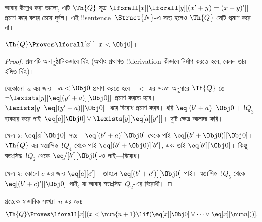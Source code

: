 \documentclass[../../../include/open-logic-section]{subfiles}
\begin{document}
আবার উল্লেখ করা ভালো, এটি $\Th{Q}$ সূত্র
$\lforall[x][\lforall[y][(x' + y) = (x + y)']]$ প্রমাণ করে বলার চেয়ে দুর্বল।
এই !!{sentence}~$\Struct{N}$-এ সত্য হলেও $\Th{Q}$ সেটি প্রমাণ করে না।

\begin{lem}
$\Th{Q} \Proves \lforall[x][\lnot x < \Obj 0]$।
\end{lem}

\begin{proof}
প্রমাণটি অনানুষ্ঠানিকভাবে দিই (অর্থাৎ প্রথাগত !!{derivation} কীভাবে নির্মাণ
করতে হবে, কেবল তার ইঙ্গিত দিই)।

যেকোনো~$a$-এর জন্য $\lnot a < \Obj 0$ প্রমাণ করতে হবে। $<$-এর সংজ্ঞা
অনুসারে $\Th{Q}$-তে
$\lnot \lexists[y][\eq[(y'+a)][\Obj 0]]$ প্রমাণ করতে হবে।
$\lexists[y][\eq[(y'+a)][\Obj 0]]$ ধরে বিরোধ প্রমাণ করব। ধরি
$\eq[(b'+a)][\Obj 0]$। $!Q_3$ ব্যবহার করে পাই
$\eq[a][\Obj 0] \lor \lexists[y][\eq[a][y']]$। দুটি ক্ষেত্র আলাদা করি।

ক্ষেত্র ১: $\eq[a][\Obj 0]$ সত্য। $\eq[(b'+a)][\Obj 0]$ থেকে পাই
$\eq[(b' + \Obj 0)][\Obj 0]$। $\Th{Q}$-এর স্বতঃসিদ্ধ~$!Q_4$ থেকে পাই
$\eq[(b' + \Obj 0)][b']$, এবং তাই $\eq[b'][\Obj 0]$। কিন্তু
স্বতঃসিদ্ধ~$!Q_2$ থেকে $\eq/[b'][\Obj 0]$-ও পাই—বিরোধ।

ক্ষেত্র ২: কোনো $c$-এর জন্য $\eq[a][c']$। তাহলে
$\eq[(b' + c')][\Obj 0]$ পাই। স্বতঃসিদ্ধ~$!Q_5$ থেকে
$\eq[(b' + c)'][\Obj 0]$ পাই, যা আবার স্বতঃসিদ্ধ~$Q_2$-এর বিরোধী।
\end{proof}

\begin{lem}
প্রত্যেক স্বাভাবিক সংখ্যা~$n$-এর জন্য
  \[
  \Th{Q} \Proves
  \lforall[x][(x < \num {n+1} \lif (\eq[x][\Obj 0] \lor \dots \lor
    \eq[x][\num n]))].
  \]
\end{lem}
\end{document}
